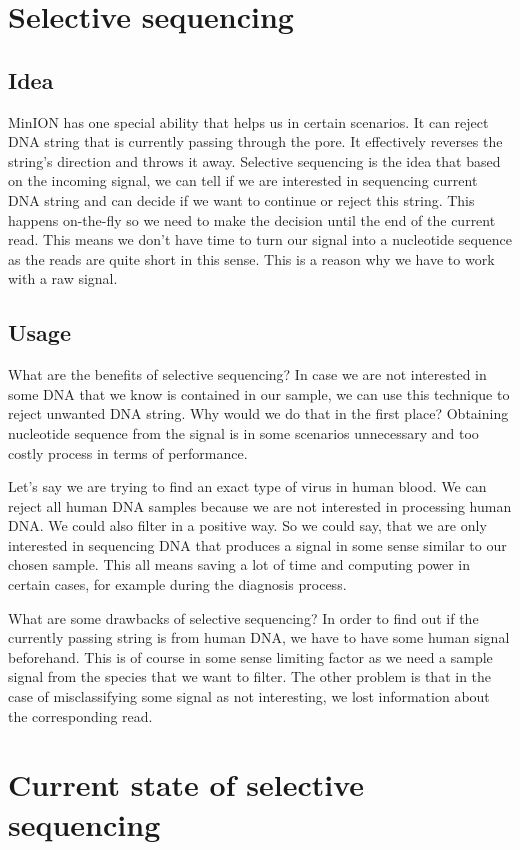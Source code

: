 \section{Selective sequencing}

\subsection{Idea}

MinION has one special ability that helps us in certain scenarios. It can reject
DNA string that is currently passing through the pore. It effectively reverses
the string’s direction and throws it away. Selective sequencing is the idea that
based on the incoming signal, we can tell if we are interested in sequencing current
DNA string and can decide if we want to continue or reject this string. This happens
on-the-fly so we need to make the decision until the end of the current read. This means
we don't have time to turn our signal into a nucleotide sequence as the reads are
quite short in this sense. This is a reason why we have to work with a raw signal.

\subsection{Usage}

What are the benefits of selective sequencing? In case we are not interested
in some DNA that we know is contained in our sample, we can use this technique to
reject unwanted DNA string. Why would we do that in the first place? Obtaining
nucleotide sequence from the signal is in some scenarios unnecessary and too
costly process in terms of performance. 

Let's say we are trying to find an exact type of virus in human blood. We can
reject all human DNA samples because we are not interested in processing human
DNA. We could also filter in a positive way. So we could say, that we are only
interested in sequencing DNA that produces a signal in some sense similar to our
chosen sample. This all means saving a lot of time and computing power in certain
cases, for example during the diagnosis process.

What are some drawbacks of selective sequencing? In order to find out if the currently
passing string is from human DNA, we have to have some human signal beforehand.
This is of course in some sense limiting factor as we need a sample signal from
the species that we want to filter. The other problem is that in the case of misclassifying
some signal as not interesting, we lost information about the corresponding
read.

\section{Current state of selective sequencing}
